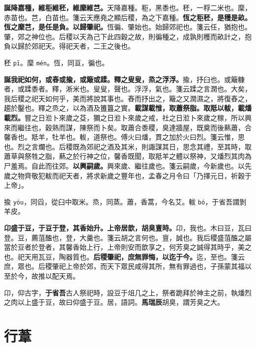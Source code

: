 \textbf{誕降嘉種，維秬維秠，維穈維芑。}{\footnotesize 天降嘉種。秬，黑黍也。秠，一稃二米也。穈，赤苗也。芑，白苗也。箋云天應堯之顯后稷，為之下嘉種。}\textbf{恆之秬秠，是穫是畝。恆之穈芑，是任是負。以歸肇祀。}{\footnotesize 恆徧、肇始也。始歸郊祀也。箋云任，猶抱也。肇，郊之神位也。后稷以天為己下此四穀之故，則徧種之，成孰則穫而畝計之，抱負以歸於郊祀天。得祀天者，二王之後也。}

\begin{quoting}秠 \texttt{pī}。穈 \texttt{mén}。恆，同亘，徧也。\end{quoting}

\textbf{誕我祀如何，或舂或揄，或簸或蹂。釋之叟叟，烝之浮浮。}{\footnotesize 揄，抒臼也。或簸糠者，或蹂黍者。釋，淅米也。叟叟，聲也。浮浮，氣也。箋云蹂之言潤也。大矣，我后稷之祀天如何乎，美而將說其事也。舂而抒出之，簸之又潤濕之，將復舂之，趨於鑿也。釋之烝之，以為酒及簠簋之實。}\textbf{載謀載惟，取蕭祭脂。取羝以軷，載燔載烈。}{\footnotesize 嘗之日涖卜來歲之芟，獮之日涖卜來歲之戒，社之日涖卜來歲之稼，所以興來而繼往也，穀熟而謀，陳祭而卜矣。取蕭合黍稷，臭達牆屋，既奠而後爇蕭，合馨香也。羝羊，牡羊也。軷，道祭也。傅火曰燔，貫之加於火曰烈。箋云惟，思也。烈之言爛也。后稷既為郊祀之酒及其米，則諏謀其日，思念其禮，至其時，取蕭草與祭牲之脂，爇之於行神之位，馨香既聞，取羝羊之體以祭神，又燔烈其肉為尸羞焉。自此而往郊。}\textbf{以興嗣歲。}{\footnotesize 興來歲、繼往歲也。箋云嗣歲，今新歲也。以先歲之物齊敬犯軷而祀天者，將求新歲之豐年也，孟春之月令曰「乃擇元日，祈穀于上帝」。}

\begin{quoting}揄 \texttt{yóu}，同舀，從臼中取米。烝，同蒸。蕭，香蒿，今名艾。軷 \texttt{bó}，于省吾謂剝羊皮。\end{quoting}

\textbf{卬盛于豆，于豆于登，其香始升。上帝居歆，胡臭亶時。}{\footnotesize 卬，我也。木曰豆，瓦曰登。豆，薦菹醢也，登，大羹也。箋云胡之言何也。亶，誠也。我后稷盛菹醢之屬當於豆者於登者，其馨香始上行，上帝則安而歆享之，何芳臭之誠得其時乎，美之也。祀天用瓦豆，陶器質也。}\textbf{后稷肇祀，庶無罪悔，以迄于今。}{\footnotesize 迄，至也。箋云庶，眾也。后稷肇祀上帝於郊，而天下眾民咸得其所，無有罪過也，子孫蒙其福以至於今，故推以配天焉。}

\begin{quoting}卬，仰古字，\textbf{于省吾}古人祭祀時，設豆于俎几之上，祭者跪拜於神主之前，執燔烈之肉以上盛于豆，故曰仰盛于豆。居，語詞。\textbf{馬瑞辰}胡臭，謂芳臭之大。\end{quoting}

\section{行葦}

